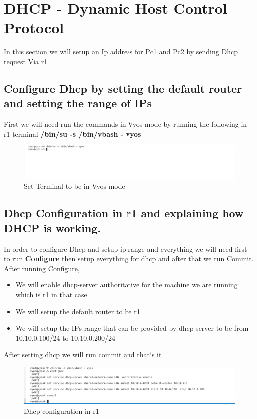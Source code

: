 \label{DHCP - Dynamic Host Control Protocol}
\chapter{DHCP - Dynamic Host Control Protocol}

In this section we will setup an Ip address for Pc1 and Pc2 by sending Dhcp request Via r1

\section{Configure Dhcp by setting the default router and setting the range of IPs}

First we will need run the commands in Vyos mode by running the following in r1 terminal  \textbf{/bin/su -s /bin/vbash - vyos}

\begin{figure}[H]
\centering
  \includegraphics[width=400pt]{Images/vyosmode.png}
  \caption{Set Terminal to be in Vyos mode}
  \label{fig:3.1}
\end{figure}
\section{Dhcp Configuration in r1 and explaining how DHCP is working.}
In order to configure Dhcp and setup ip range and everything  we will need first to run \textbf{Configure} then setup everything for dhcp and after that we run Commit. After running Configure, 
\begin{itemize}
  \item We will enable dhcp-server authoritative for the machine we are running which is r1 in that case
  \item We will setup the default router to be r1 
  \item We will setup the IPs range that can be provided by dhcp server to be from 10.10.0.100/24 to 10.10.0.200/24
\end{itemize}
After setting dhcp we will run commit and that`s it

\begin{figure}[H]
\centering
  \includegraphics[width=400pt]{Images/dhcpset-up.png}
  \caption{Dhcp configuration in r1}
  \label{fig:3.2}
\end{figure}

